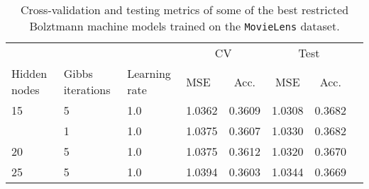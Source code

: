 \begin{table}
\centering
\begin{tabular}{llllcccc}
\toprule
     &     &      & \multicolumn{2}{c}{CV} & \multicolumn{2}{c}{Test}\\
     \cmidrule(lr){4-5}\cmidrule(lr){6-7}
Hidden nodes & Gibbs iterations  & Learning rate &    MSE & Acc. & MSE & Acc.  \\
\midrule
15 & 5 & 1.0 &   1.0362 &      0.3609 &   1.0308 &        0.3682 \\
   & 1 & 1.0 &   1.0375 &      0.3607 &   1.0330 &        0.3682 \\
20 & 5 & 1.0 &   1.0375 &      0.3612 &   1.0320 &        0.3670 \\
25 & 5 & 1.0 &   1.0394 &      0.3603 &   1.0344 &        0.3669 \\
\bottomrule
\end{tabular}
\caption{Cross-validation and testing metrics of some of the best restricted Bolztmann machine models trained on the \texttt{MovieLens} dataset.}
\label{tab:results.rbm}
\end{table}
